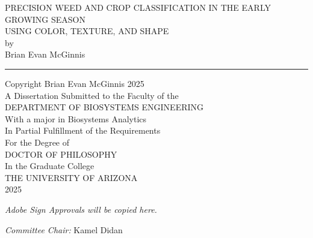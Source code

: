 \documentclass[letterpaper, notitlepage]{report}
\begin{document}

\begin{titlepage}
\begin{center}
\huge
PRECISION WEED AND CROP CLASSIFICATION IN THE EARLY GROWING SEASON \\
USING COLOR, TEXTURE, AND SHAPE \\

\large
{} 
\vspace{3cm}
by\\
Brian Evan McGinnis \\
\vspace{1cm}
\hrule
\vspace{1cm}
Copyright \textcopyright  Brian Evan McGinnis 2025 \\
A Dissertation Submitted to the Faculty of the \\
DEPARTMENT OF BIOSYSTEMS ENGINEERING \\
With a major in Biosystems Analytics \\
In Partial Fulfillment of the Requirements \\
For the Degree of \\
DOCTOR OF PHILOSOPHY \\
In the Graduate College \\
THE UNIVERSITY OF ARIZONA \\
2025 \\
\end{center}
\end{titlepage}
\date{}
\newpage
{}
%
\begin{center}
\huge
\textit{Adobe Sign Approvals will be copied here.}
\end{center}
\textit{Committee Chair:} Kamel Didan
\newpage

%
%

\end{document}
